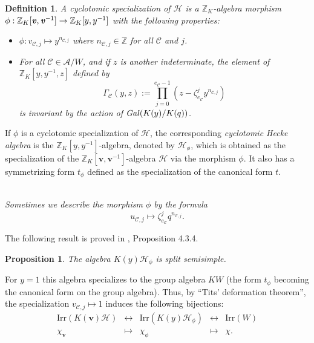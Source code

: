 \documentclass[10pt,a4paper,titlepage]{article}
\newtheorem{definition}[theorem]{Definition}
\newtheorem{proposition}[theorem]{Proposition}
\begin{document}
\begin{definition}\label{specialization}
A cyclotomic specialization of $\mathcal{H}$ is a
$\mathbb{Z}_K$-algebra morphism $\phi:
\mathbb{Z}_K[\textbf{\emph{v}},\textbf{\emph{v}}^{-1}]\rightarrow
\mathbb{Z}_K[y,y^{-1}]$ with the following properties:
\begin{itemize}
  \item $\phi: v_{\mathcal{C},j} \mapsto y^{n_{\mathcal{C},j}}$ where
  $n_{\mathcal{C},j} \in \mathbb{Z}$ for all $\mathcal{C}$ and $j$.
  \item For all $\mathcal{C} \in \mathcal{A}/W$, and if $z$ is another
  indeterminate, the element of $\mathbb{Z}_K[y,y^{-1},z]$ defined by
  $$\Gamma_\mathcal{C}(y,z):=\prod_{j=0}^{e_\mathcal{C}-1}(z-\zeta_{e_\mathcal{C}}^jy^{n_{\mathcal{C},j}})$$
  is invariant by the action of $\textrm{\emph{Gal}}(K(y)/K(q))$.
\end{itemize}
\end{definition}

If $\phi$ is a cyclotomic specialization of $\mathcal{H}$,
the corresponding \emph{cyclotomic Hecke algebra} is the
$\mathbb{Z}_K[y,y^{-1}]$-algebra, denoted by $\mathcal{H}_\phi$,
which is obtained as the specialization of the
$\mathbb{Z}_K[\textbf{v},\textbf{v}^{-1}]$-algebra $\mathcal{H}$ via
the morphism $\phi$. It also has a symmetrizing form $t_\phi$
defined as the specialization of the canonical form $t$.\\
\\
\begin{remark} \emph{Sometimes we describe the morphism $\phi$ by the
formula}
$$u_{\mathcal{C},j} \mapsto \zeta_{e_\mathcal{C}}^j q^{n_{\mathcal{C},j}}.$$
\end{remark}

The following result is proved in \cite{Chlou}, Proposition 4.3.4.

\begin{proposition}\label{cyclotomic split semisimple}
The algebra $K(y)\mathcal{H}_\phi$ is split semisimple. 
\end{proposition}

For $y=1$ this algebra specializes to the group
algebra $KW$ (the form $t_\phi$ becoming the canonical form on the
group algebra). Thus, by ``Tits' deformation theorem'', the
specialization $v_{\mathcal{C},j} \mapsto 1$ induces the following bijections:
$$\begin{array}{ccccc}
    \textrm{Irr}(K(\textbf{v})\mathcal{H}) & \leftrightarrow & \textrm{Irr}(K(y)\mathcal{H}_\phi) & \leftrightarrow & \textrm{Irr}(W) \\
    \chi_{\textbf{v}} & \mapsto & \chi_{\phi} & \mapsto & \chi.
  \end{array}$$
\end{document}
